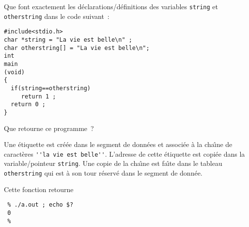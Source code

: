 Que font exactement les d\'eclarations/d\'efinitions des variables
\verb+string+ et \verb+otherstring+ dans le code suivant~:
\begin{verbatim}
#include<stdio.h>
char *string = "La vie est belle\n" ;
char otherstring[] = "La vie est belle\n";
int
main
(void)
{
  if(string==otherstring)
     return 1 ;
  return 0 ;
}
\end{verbatim}
Que retourne ce programme~?
\ifcorrection
\begin{correction}
  Une \'etiquette est cr\'e\'ee dans le segment de donn\'ees et
  associ\'ee \`a la cha\^\i{}ne de caract\`eres
  \verb+''la vie est belle''+.  L'adresse de cette \'etiquette est
  copi\'ee dans la variable/pointeur \verb+string+. Une copie de la
  cha\^\i{}ne est fa\^\i{}te dans le tableau \verb+otherstring+ qui
  est \`a son tour r\'eserv\'e dans le segment de donn\'ee.
 \par
 Cette fonction retourne
 \begin{verbatim}
 % ./a.out ; echo $?
 0
 % 
 \end{verbatim}
\end{correction}
\fi
